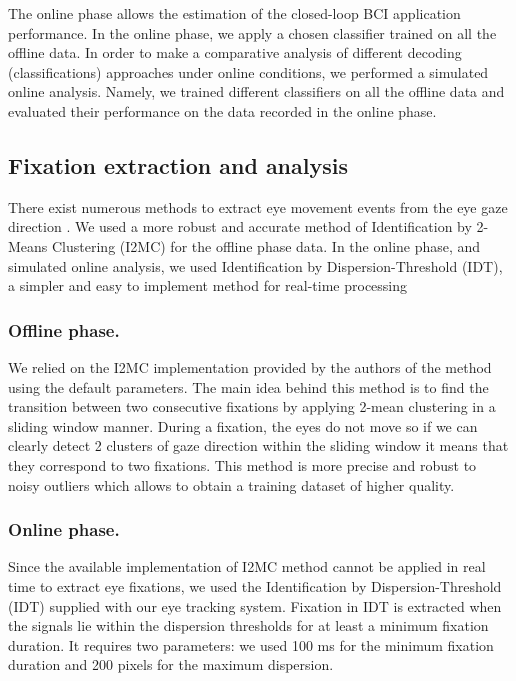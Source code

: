 \documentclass[12pt]{iopart}
\begin{document}
The online phase allows the estimation of the closed-loop BCI application performance. In the online phase, we apply a chosen classifier trained on all the offline data. In order to make a comparative analysis of different decoding (classifications) approaches under online conditions, we performed a simulated online analysis. Namely, we trained different classifiers on all the offline data and evaluated their performance on the data recorded in the online phase. 

\subsection{Fixation extraction and analysis}
There exist numerous methods to extract eye movement events
from the eye gaze direction \cite{}.
We used a more robust and accurate method of 
Identification by 2-Means Clustering (I2MC)
\cite{hessels_noise-robust_2017}
for the offline phase data.
In the online phase, and simulated online analysis,
we used Identification by Dispersion-Threshold (IDT), a simpler and
easy to implement method for real-time processing \cite{salvucci_identifying_2000}


\subsubsection*{Offline phase.}
We relied on the I2MC implementation provided by the authors of the method
using the default parameters.
The main idea behind this method is to find the transition between two consecutive fixations
by applying 2-mean clustering in a sliding window manner.
During a fixation, the eyes do not move so if we can clearly detect
2 clusters of gaze direction within the sliding window
it means that they correspond to two fixations.
This method is more precise and robust to noisy outliers which
allows to obtain a training dataset of higher quality.

\subsubsection*{Online phase.}
Since the available implementation of I2MC method cannot be applied 
in real time to extract eye fixations,
we used the Identification by Dispersion-Threshold (IDT) 
supplied with our eye tracking system. Fixation in IDT is extracted
when the signals lie within the dispersion thresholds for at least a minimum fixation duration.
It requires two parameters: we used 100 ms for the minimum fixation duration
and 200 pixels for the maximum dispersion.
\end{document}
